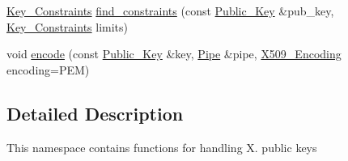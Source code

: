 \begin{DoxyCompactItemize}
\item 
\hyperlink{namespaceBotan_aed0885e5c70627dd43827b966e727654}{Key\-\_\-\-Constraints} \hyperlink{namespaceBotan_1_1X509_ac5a3edb04650c4affd71622450875e21}{find\-\_\-constraints} (const \hyperlink{classBotan_1_1Public__Key}{Public\-\_\-\-Key} \&pub\-\_\-key, \hyperlink{namespaceBotan_aed0885e5c70627dd43827b966e727654}{Key\-\_\-\-Constraints} limits)
\item 
void \hyperlink{namespaceBotan_1_1X509_afc06c288334ad1da29803c9c706cabe3}{encode} (const \hyperlink{classBotan_1_1Public__Key}{Public\-\_\-\-Key} \&key, \hyperlink{classBotan_1_1Pipe}{Pipe} \&pipe, \hyperlink{namespaceBotan_a53759b4ed1fb93549f307fcf68729d2f}{X509\-\_\-\-Encoding} encoding=P\-E\-M)
\end{DoxyCompactItemize}


\subsection{Detailed Description}
This namespace contains functions for handling X. public keys 

